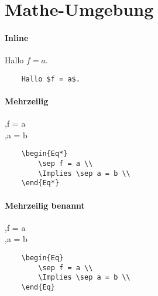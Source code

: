 \documentclass[]{article}
\begin{document}
\section{Mathe-Umgebung}

\paragraph{Inline}
Hallo $f = a$.
\begin{Verbatim}
	Hallo $f = a$.
\end{Verbatim}

\paragraph{Mehrzeilig}
\begin{Eq*}
	\sep f = a \\
	\Implies \sep a = b \\
\end{Eq*}
\begin{Verbatim}
	\begin{Eq*}
		\sep f = a \\
		\Implies \sep a = b \\
	\end{Eq*}
\end{Verbatim}

\paragraph{Mehrzeilig benannt}
\begin{Eq}
	\sep f = a \\
	\Implies \sep a = b \\
\end{Eq}
\begin{Verbatim}
	\begin{Eq}
		\sep f = a \\
		\Implies \sep a = b \\
	\end{Eq}
\end{Verbatim}
\end{document}
